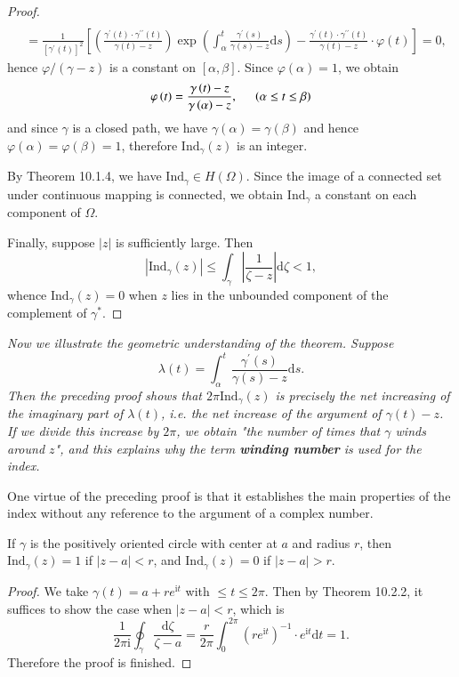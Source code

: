 \begin{proof}
$$\begin{aligned}
\\
&=\frac{1}{\left[ \gamma ^{\prime}\left( t \right) \right] ^2}\left[ \left( \frac{\gamma ^{\prime}\left( t \right) \cdot \gamma ^{\prime\prime}\left( t \right)}{\gamma \left( t \right) -z} \right) \exp \left( \int_{\alpha}^t{\frac{\gamma ^{\prime}\left( s \right)}{\gamma \left( s \right) -z}\mathrm{d}s} \right) -\frac{\gamma ^{\prime}\left( t \right) \cdot \gamma ^{\prime\prime}\left( t \right)}{\gamma \left( t \right) -z}\cdot \varphi \left( t \right) \right] =0,
\end{aligned}
$$
hence $\varphi/(\gamma-z)$ is a constant on $[\alpha,\beta]$. Since $\varphi(\alpha)=1$, we obtain 
$$
\varphi \left( t \right) =\frac{\gamma \left( t \right) -z}{\gamma \left( \alpha \right) -z},\hspace{0.5cm}\left( \alpha \le t\le \beta \right) 
$$
and since $\gamma$ is a closed path, we have $\gamma(\alpha)=\gamma(\beta)$ and hence $\varphi(\alpha)=\varphi(\beta)=1$, therefore $\mathrm{Ind}_\gamma(z)$ is an integer.\par
By Theorem 10.1.4, we have $\mathrm{Ind}_\gamma\in H(\Omega)$. Since the image of a connected set under continuous mapping is connected, we obtain $\mathrm{Ind}_\gamma$ a constant on each component of $\Omega$.\par
Finally, suppose $|z|$ is sufficiently large. Then 
$$
\left| \mathrm{Ind}_{\gamma}\left( z \right) \right|\le \int_{\gamma}{\left| \frac{1}{\zeta -z} \right|\mathrm{d}\zeta}<1,
$$
whence $\mathrm{Ind}_\gamma(z)=0$ when $z$ lies in the unbounded component of the complement of $\gamma^*$.
\end{proof}
\begin{note}\em
Now we illustrate the geometric understanding of the theorem. Suppose 
$$\lambda(t)=\int_{\alpha}^{t}\frac{\gamma^\prime(s)}{\gamma(s)-z}\mathrm{d}s.$$
Then the preceding proof shows that $2\pi\mathrm{Ind}_\gamma(z)$ is precisely the net increasing of the imaginary part of $\lambda(t)$, i.e. the net increase of the argument of $\gamma(t)-z$. If we divide this increase by $2\pi$, we obtain "the number of times that $\gamma$ winds around $z$", and this explains why the term \textbf{winding number} is used for the index.
\end{note}
 One virtue of the preceding proof is that it establishes the main properties of the index without any reference to the argument of a complex number.
 \begin{theorem}
 If $\gamma$ is the positively oriented circle with center at $a$ and radius $r$, then $\mathrm{Ind}_\gamma(z)=1$ if $|z-a|<r$, and $\mathrm{Ind}_\gamma(z)=0$ if $|z-a|>r$.
 \end{theorem}
 \begin{proof}
We take $\gamma(t)=a+re^{\mathrm{i}t}$ with $\le t\le 2\pi$. Then by Theorem  10.2.2, it suffices to show the case when $|z-a|<r$, which is 
$$
\frac{1}{2\pi \mathrm{i}}\oint_{\gamma}{\frac{\mathrm{d}\zeta}{\zeta -a}}=\frac{r}{2\pi}\int_0^{2\pi}{\left( re^{\mathrm{i}t} \right) ^{-1}\cdot e^{\mathrm{i}t}\mathrm{d}t}=1.
$$
Therefore the proof is finished.
\end{proof}
